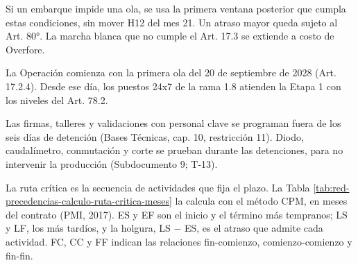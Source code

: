 \documentclass[formulario]{../../comun/overfore}
\begin{document}
Si un embarque impide una ola, se usa la primera ventana posterior que cumpla estas condiciones, sin mover H12 del mes 21. Un atraso mayor queda sujeto al Art. 80°. La marcha blanca que no cumple el Art. 17.3 se extiende a costo de Overfore.

La Operación comienza con la primera ola del 20 de septiembre de 2028 (Art. 17.2.4). Desde ese día, los puestos 24x7 de la rama 1.8 atienden la Etapa 1 con los niveles del Art. 78.2.

Las firmas, talleres y validaciones con personal clave se programan fuera de los seis días de detención (Bases Técnicas, cap. 10, restricción 11). Diodo, caudalímetro, conmutación y corte se prueban durante las detenciones, para no intervenir la producción (Subdocumento 9; T-13).

La ruta crítica es la secuencia de actividades que fija el plazo. La Tabla \ref{tab:red-precedencias-calculo-ruta-critica-meses} la calcula con el método CPM, en meses del contrato (PMI, 2017). ES y EF son el inicio y el término más tempranos; LS y LF, los más tardíos, y la holgura, LS − ES, es el atraso que admite cada actividad. FC, CC y FF indican las relaciones fin-comienzo, comienzo-comienzo y fin-fin.
\end{document}
